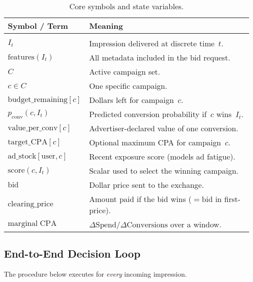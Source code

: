 \documentclass[11pt]{article}
\begin{document}
\begin{table}[H]
  \centering
  \caption{Core symbols and state variables.}
  \label{tab:variables}
  \begin{tabular}{ll}
    \hline
    Symbol / Term & Meaning \\
    \hline \\
    $I_t$ & Impression delivered at discrete time~$t$. \\
    $\mathrm{features}(I_t)$ & All metadata included in the bid request. \\
    $C$ & Active campaign set. \\
    $c \in C$ & One specific campaign. \\
    $\mathrm{budget\_remaining}[c]$ & Dollars left for campaign~$c$. \\
    $p_{\mathrm{conv}}(c,I_t)$ & Predicted conversion probability
    if~$c$ wins~$I_t$. \\
    $\mathrm{value\_per\_conv}[c]$ & Advertiser-declared value of one
    conversion. \\
    $\mathrm{target\_CPA}[c]$ & Optional maximum CPA for campaign~$c$. \\
    $\mathrm{ad\_stock}[\text{user},c]$ & Recent exposure score
    (models ad fatigue). \\
    $\mathrm{score}(c,I_t)$ & Scalar used to select the winning campaign. \\
    $\mathrm{bid}$ & Dollar price sent to the exchange. \\
    $\mathrm{clearing\_price}$ & Amount paid if the bid wins
    ($=\mathrm{bid}$ in first-price). \\
    $\mathrm{marginal\;CPA}$ & $\Delta\text{Spend} /
    \Delta\text{Conversions}$ over a window.\\
  \end{tabular}
\end{table}

\subsection{End-to-End Decision Loop}\label{sec:decisionloop}
The procedure below executes for \emph{every} incoming impression.
\end{document}
